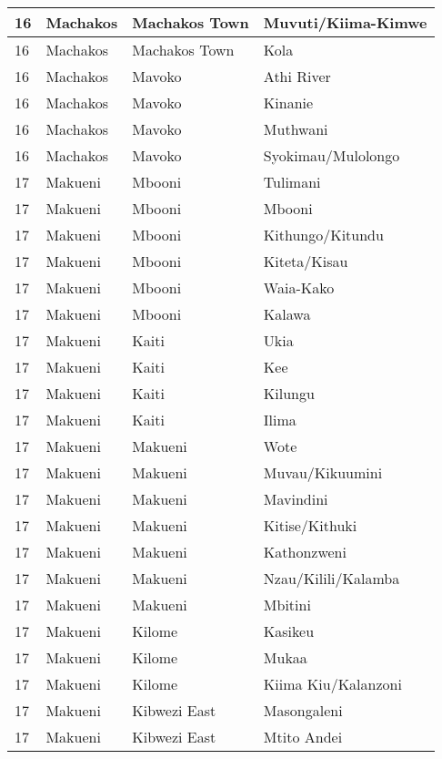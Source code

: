 \begin{table}[!ht]
\begin{tabular}{|l|l|l|l|}
        16 & Machakos & Machakos Town & Muvuti/Kiima-Kimwe \\ \hline
        16 & Machakos & Machakos Town & Kola \\ \hline
        16 & Machakos & Mavoko & Athi River \\ \hline
        16 & Machakos & Mavoko & Kinanie \\ \hline
        16 & Machakos & Mavoko & Muthwani \\ \hline
        16 & Machakos & Mavoko & Syokimau/Mulolongo \\ \hline
        17 & Makueni & Mbooni & Tulimani \\ \hline
        17 & Makueni & Mbooni & Mbooni \\ \hline
        17 & Makueni & Mbooni & Kithungo/Kitundu \\ \hline
        17 & Makueni & Mbooni & Kiteta/Kisau \\ \hline
        17 & Makueni & Mbooni & Waia-Kako \\ \hline
        17 & Makueni & Mbooni & Kalawa \\ \hline
        17 & Makueni & Kaiti & Ukia \\ \hline
        17 & Makueni & Kaiti & Kee \\ \hline
        17 & Makueni & Kaiti & Kilungu \\ \hline
        17 & Makueni & Kaiti & Ilima \\ \hline
        17 & Makueni & Makueni & Wote \\ \hline
        17 & Makueni & Makueni & Muvau/Kikuumini \\ \hline
        17 & Makueni & Makueni & Mavindini \\ \hline
        17 & Makueni & Makueni & Kitise/Kithuki \\ \hline
        17 & Makueni & Makueni & Kathonzweni \\ \hline
        17 & Makueni & Makueni & Nzau/Kilili/Kalamba \\ \hline
        17 & Makueni & Makueni & Mbitini \\ \hline
        17 & Makueni & Kilome & Kasikeu \\ \hline
        17 & Makueni & Kilome & Mukaa \\ \hline
        17 & Makueni & Kilome & Kiima Kiu/Kalanzoni \\ \hline
        17 & Makueni & Kibwezi East & Masongaleni \\ \hline
        17 & Makueni & Kibwezi East & Mtito Andei \\ \hline

\end{tabular}
\end{table}
